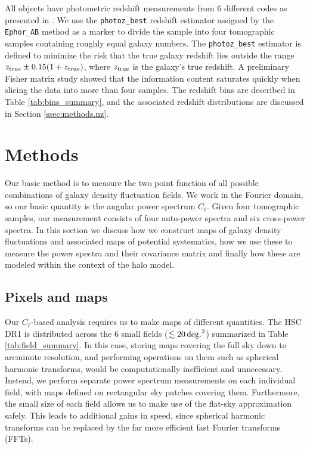 \documentclass[a4paper,11pt]{article}
\begin{document}
  All objects have photometric redshift measurements from 6 different codes as presented in \cite{2018PASJ...70S...9T}. We use the {\tt photoz\_best} redshift estimator assigned by the {\tt Ephor\_AB} method as a marker to divide the sample into four tomographic samples containing roughly equal galaxy numbers. The {\tt photoz\_best} estimator is defined to minimize the risk that the true galaxy redshift lies outside the range $z_{\rm true}\pm 0.15(1+z_{\rm true})$, where $z_{\rm true}$ is the galaxy's true redshift. A preliminary Fisher matrix \cite{Fisher:1935} study showed that the information content saturates quickly when slicing the data into more than four samples. The redshift bins are described in Table \ref{tab:bins_summary}, and the associated redshift distributions are discussed in Section \ref{ssec:methods.nz}.

\section{Methods}\label{sec:methods}

Our basic method is to measure the two point function of all possible combinations of galaxy density fluctuation fields. We work in the Fourier domain, so our basic quantity is the angular power spectrum $C_\ell$. Given four tomographic samples, our measurement consists of four auto-power spectra and six cross-power spectra. In this section we discuss how we construct maps of galaxy density fluctuations and associated maps of potential systematics, how we use these to measure the power spectra and their covariance matrix and finally how these are modeled within the context of the halo model.


  \subsection{Pixels and maps}\label{ssec:methods.pix}
    Our $C_\ell$-based analysis requires us to make maps of different quantities. The HSC DR1 is distributed across the 6 small fields ($\lesssim20\,{\rm deg.}^2$) summarized in Table \ref{tab:field_summary}. In this case, storing maps covering the full sky down to arcminute resolution, and performing operations on them such as spherical harmonic transforms, would be computationally inefficient and unnecessary. Instead, we perform separate power spectrum measurements on each individual field, with maps defined on rectangular sky patches covering them. Furthermore, the small size of each field allows us to make use of the flat-sky approximation safely. This leads to additional gains in speed, since spherical harmonic transforms can be replaced by the far more efficient fast Fourier transforms (FFTs).
    
\end{document}
